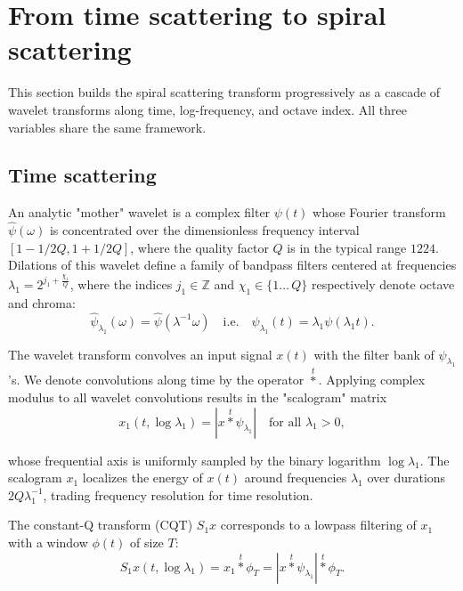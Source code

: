 \documentclass[twoside,a4paper]{article}
\begin{document}
\section{From time scattering to spiral scattering}
This section builds the spiral scattering transform progressively as a cascade of wavelet transforms along time, log-frequency, and octave index. All three variables share the same framework.

\subsection{Time scattering}

An analytic "mother" wavelet is a complex filter $\psi(t)$
whose Fou\-rier transform $\widehat{\psi}(\omega)$ is concentrated over the
dimensionless frequency interval $[1-1/2Q,1+1/2Q]$, where the quality factor $Q$ is in the typical range $12$\textendash$24$. Dilations of this wavelet
define a family of bandpass filters centered at frequencies
$ \lambda_{1} = 2^{j_{1} + \frac{\chi_{1}}{Q}}$,
where the indices $j_{1} \in \mathbb{Z}$ and $\chi_{1} \in \{1\ldots\,Q\}$ respectively denote octave and chroma:
\begin{equation}
    \widehat{\psi}_{\lambda_{1}}(\omega) = \widehat{\psi}(\lambda^{-1}\omega)
    \quad\mathrm{i.e.}\quad
    \psi_{\lambda_{1}}(t)=\lambda_{1}\psi(\lambda_{1}t).
\label{eq:wavelet-dilations}
\end{equation}

The wavelet transform convolves an input signal $x(t)$ with the filter bank of $\psi_{\lambda_1}$'s. We denote convolutions along time by the operator $\overset{t}{\ast}$. Applying complex modulus to all wavelet convolutions results in the "scalogram" matrix
\begin{equation}
    x_1(t, \log \lambda_1) =
    |x \overset{t}{\ast} \psi_{\lambda_1}| \quad \text{for all } \lambda_1 > 0,
\label{eq:scalogram}
\end{equation}

whose frequential axis is uniformly sampled by the binary logarithm $\log \lambda_1$. The scalogram $x_1$ localizes the energy of $x(t)$ around frequencies $\lambda_1$ over durations $2 Q \lambda_1^{-1}$, trading frequency resolution for time resolution.

The constant-Q transform (CQT) $S_1 x$ corresponds to a lowpass filtering of $x_1$ with a window $\phi(t)$ of size $T$:
\begin{equation}
S_1 x (t, \log \lambda_1) =
x_1 \overset{t}{\ast} \phi_T =
| x \overset{t}{\ast} \psi_{\lambda_{1}} | \overset{t}{\ast} \phi_T.
\label{eq:S1}
\end{equation}
\end{document}
